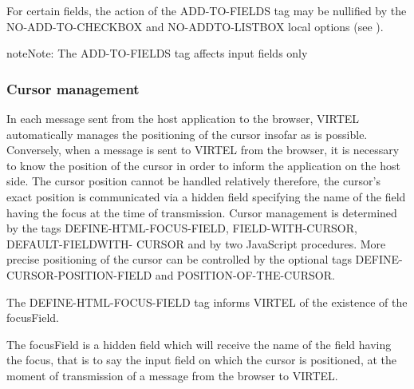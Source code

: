 \documentclass[letterpaper,10pt,english]{sphinxmanual}
\begin{document}
For certain fields, the action of the ADD-TO-FIELDS tag may be nullified by the NO-ADD-TO-CHECKBOX and NO-ADDTO-LISTBOX local options (see {\hyperref[\detokenize{User_Guide:v457ug-setting-local-options}]{}}).

\begin{sphinxadmonition}{note}{Note:}
The ADD-TO-FIELDS tag affects input fields only
\end{sphinxadmonition}


\subsubsection{Cursor management}
\label{\detokenize{User_Guide:cursor-management}}\label{\detokenize{User_Guide:v457ug-cursor-management}}

In each message sent from the host application to the browser, VIRTEL automatically manages the positioning of the
cursor insofar as is possible. Conversely, when a message is sent to VIRTEL from the browser, it is necessary to know
the position of the cursor in order to inform the application on the host side. The cursor position cannot be handled
relatively therefore, the cursor’s exact position is communicated via a hidden field specifying the name of the field
having the focus at the time of transmission.
Cursor management is determined by the tags DEFINE-HTML-FOCUS-FIELD, FIELD-WITH-CURSOR, DEFAULT-FIELDWITH-
CURSOR and by two JavaScript procedures. More precise positioning of the cursor can be controlled by the
optional tags DEFINE-CURSOR-POSITION-FIELD and POSITION-OF-THE-CURSOR.


The DEFINE-HTML-FOCUS-FIELD tag informs VIRTEL of the existence of the focusField.

\begin{sphinxVerbatim}[commandchars=\\\{\}]
   
\end{sphinxVerbatim}

The focusField is a hidden field which will receive the name of the field having the focus, that is to say the input field
on which the cursor is positioned, at the moment of transmission of a message from the browser to VIRTEL.
\end{document}
